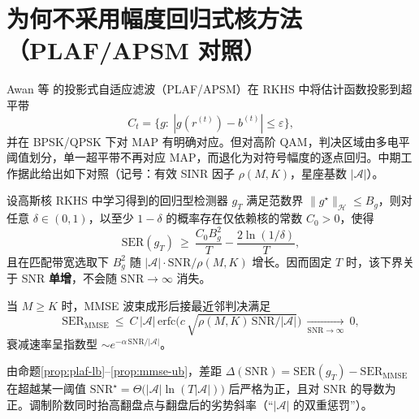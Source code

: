 \section{为何不采用幅度回归式核方法（PLAF/APSM 对照）}
\label{sec:plaf-gap}

Awan 等\cite{awan2018} 的投影式自适应滤波（PLAF/APSM）在 RKHS 中将估计函数投影到超平带
\begin{equation}
C_t=\big\{g:\ |g(r^{(t)})-b^{(t)}|\le\varepsilon\big\},
\end{equation}
并在 BPSK/QPSK 下对 MAP 有明确对应。但对高阶 QAM，判决区域由多电平阈值划分，单一超平带不再对应 MAP，而退化为对符号幅度的逐点回归。中期工作据此给出如下对照（记号：有效 SINR 因子 $\rho(M,K)$，星座基数 $|\mathcal{A}|$）。

\begin{proposition}
\label{prop:plaf-lb}
设高斯核 RKHS 中学习得到的回归型检测器 $g_T$ 满足范数界 $\|g^\star\|_{\mathcal{H}}\le B_g$，则对任意 $\delta\in(0,1)$，以至少 $1-\delta$ 的概率存在仅依赖核的常数 $C_0>0$，使得
\begin{equation}
\mathrm{SER}(g_T)
\ \ge\
\frac{C_0 B_g^2}{T}
-\frac{2\ln(1/\delta)}{T},
\end{equation}
且在匹配带宽选取下 $B_g^2$ 随 $|\mathcal{A}|\cdot\mathrm{SNR}/\rho(M,K)$ 增长。因而固定 $T$ 时，该下界关于 SNR \textbf{单增}，不会随 $\mathrm{SNR}\to\infty$ 消失。
\end{proposition}

\begin{proposition}
\label{prop:mmse-ub}
当 $M\ge K$ 时，MMSE 波束成形后接最近邻判决满足\cite{proakis2008,tse2005}
\begin{equation}
\mathrm{SER}_{\mathrm{MMSE}}
\ \le\
C\,|\mathcal{A}|\,\mathrm{erfc}\!\Big(
c\,\sqrt{\rho(M,K)\,\mathrm{SNR}/|\mathcal{A}|}
\Big)
\ \xrightarrow[\mathrm{SNR}\to\infty]{}\ 0,
\end{equation}
衰减速率呈指数型 $\sim e^{-\alpha\,\mathrm{SNR}/|\mathcal{A}|}$。
\end{proposition}

\begin{theorem}[不可弥合差距]
\label{thm:plaf-gap}
由命题\ref{prop:plaf-lb}--\ref{prop:mmse-ub}，差距
$\Delta(\mathrm{SNR})=\mathrm{SER}(g_T)-\mathrm{SER}_{\mathrm{MMSE}}$
在超越某一阈值 $\mathrm{SNR}^\star=\Theta\big(|\mathcal{A}|\ln(T|\mathcal{A}|)\big)$ 后严格为正，且对 SNR 的导数为正。调制阶数同时抬高翻盘点与翻盘后的劣势斜率（“$|\mathcal{A}|$ 的双重惩罚”）。
\end{theorem}

